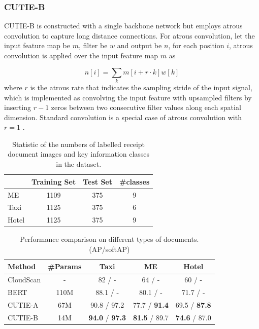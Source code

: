 \documentclass[10pt,twocolumn,letterpaper]{article}
\begin{document}
\subsubsection{CUTIE-B}
CUTIE-B is constructed with a single backbone network but employs atrous convolution to capture long distance connections. For atrous convolution, let the input feature map be $m$, filter be $w$ and output be $n$, for each position $i$, atrous convolution is applied over the input feature map $m$ as 

\begin{equation}
n[i] = \sum_k m[i+r\cdot k]w[k]
\end{equation}
where $r$ is the atrous rate that indicates the sampling stride of the input signal, which is implemented as convolving the input feature with upsampled filters by inserting $r-1$ zeros between two consecutive filter values along each spatial dimension. Standard convolution is a special case of atrous convolution with $r=1$ \cite{deeplabv1}.

\begin{table}
	\caption{Statistic of the numbers of labelled receipt document images and key information classes in the dataset.}
\begin{center}
\begin{tabular}{l | c | c | c}
	 & Training Set & Test Set & \#classes \\
	\hline
	ME & 1109 & 375 & 9 \\
	Taxi & 1125 & 375 & 6 \\
	Hotel & 1125 & 375 & 9 \\
\end{tabular}
\end{center}
	\label{tab:dataset}
\end{table}

\begin{table}
	\caption{Performance comparison on different types of documents. (AP/softAP)}
\begin{center}
\begin{tabular}{l | c | c | c | c}
	Method & \#Params & Taxi & ME & Hotel \\
	\hline
	CloudScan\cite{cloudscan} & - & 82 / - & 64 / - & 60 / - \\
	BERT\cite{bert} & 110M & 88.1 / - & 80.1 / - & 71.7 / - \\
	CUTIE-A & 67M & 90.8 / 97.2 & 77.7 / \textbf{91.4} & 69.5 / \textbf{87.8} \\
	CUTIE-B & 14M & \textbf{94.0} / \textbf{97.3} & \textbf{81.5} / 89.7 & \textbf{74.6} / 87.0 \\
\end{tabular}
\end{center}
	\label{tab:comparison}
\end{table}
\end{document}
